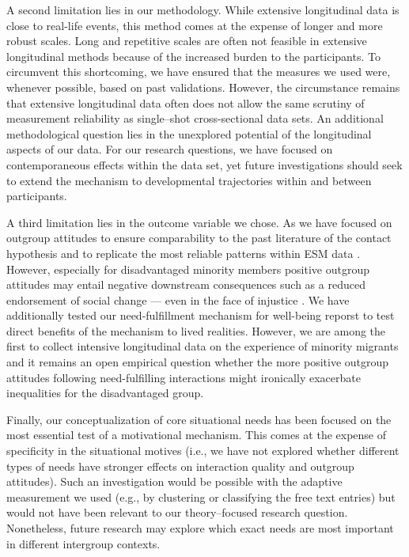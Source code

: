 \documentclass[man, 12pt, a4paper, mask]{apa7}
\theoremstyle{break}
\theoremstyle{plain}
\begin{document}
A second limitation lies in our methodology. While extensive longitudinal data is close to real-life events, this method comes at the expense of longer and more robust scales. Long and repetitive scales are often not feasible in extensive longitudinal methods because of the increased burden to the participants. To circumvent this shortcoming, we have ensured that the measures we used were, whenever possible, based on past validations. However, the circumstance remains that extensive longitudinal data often does not allow the same scrutiny of measurement reliability as single–shot cross-sectional data sets. An additional methodological question lies in the unexplored potential of the longitudinal aspects of our data. For our research questions, we have focused on contemporaneous effects within the data set, yet future investigations should seek to extend the mechanism to developmental trajectories within and between participants. 

A third limitation lies in the outcome variable we chose. As we have focused on outgroup attitudes to ensure comparability to the past literature of the contact hypothesis and to replicate the most reliable patterns within ESM data \citep[][]{Pettigrew2006}. However, especially for disadvantaged minority members positive outgroup attitudes may entail negative downstream consequences such as a reduced endorsement of social change --- even in the face of injustice \citep[e.g.,][]{dixon2012}. We have additionally tested our need-fulfillment mechanism for well-being reporst to test direct benefits of the mechanism to lived realities. However, we are among the first to collect intensive longitudinal data on the experience of minority migrants and it remains an open empirical question whether the more positive outgroup attitudes following need-fulfilling interactions might ironically exacerbate inequalities for the disadvantaged group. 

Finally, our conceptualization of core situational needs has been focused on the most essential test of a motivational mechanism. This comes at the expense of specificity in the situational motives (i.e., we have not explored whether different types of needs have stronger effects on interaction quality and outgroup attitudes). Such an investigation would be possible with the adaptive measurement we used (e.g., by clustering or classifying the free text entries) but would not have been relevant to our theory–focused research question. Nonetheless, future research may explore which exact needs are most important in different intergroup contexts. 
\end{document}
